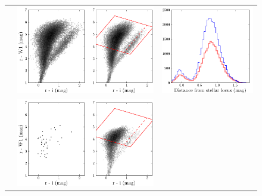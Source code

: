 \documentclass[12pt,preprint]{aastex}
\begin{document}
\begin{figure}
\begin{center}
\begin{tabular}{@{}rcc@{}}
    \raisebox{0.12\textheight}{\footnotesize{$17 < \textrm{W1} < 18$}} &
    \includegraphics[height=0.23\textheight]{lrg-02} &
    \includegraphics[height=0.23\textheight]{lrg-03} \\
    \raisebox{0.12\textheight}{\footnotesize{$18 < \textrm{W1} < 18.5$}} &
    \includegraphics[height=0.23\textheight]{lrg-04} &

\end{tabular}
\end{center}
\end{figure}
\end{document}
